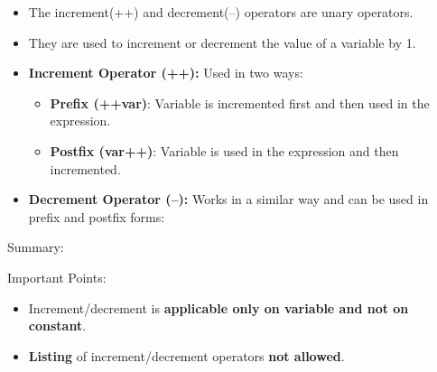 
\begin{flushleft}

	
	\begin{itemize}
		\item The increment(++) and decrement(--) operators are unary operators.
		\item They are used to increment or decrement the value of a variable by 1.
		\item \textbf{Increment Operator (++):} Used in two ways:
		\begin{itemize}
			\item \textbf{Prefix (++var)}: Variable is incremented first and then used in the expression.
			\bigskip
			
			\item \textbf{Postfix (var++)}: Variable is used in the expression and then incremented. 
			\bigskip
		\end{itemize}
		
		\item \textbf{Decrement Operator (--):} Works in a similar way and can be used in prefix and postfix forms:
		\bigskip
	\end{itemize}
	
	Summary:
	
	Important Points:
	\begin{itemize}
		\item Increment/decrement is \textbf{applicable only on variable and not on constant}.
		\bigskip
		\item \textbf{Listing} of increment/decrement operators \textbf{not allowed}.
		\bigskip
	

\end{itemize}
\end{flushleft}

